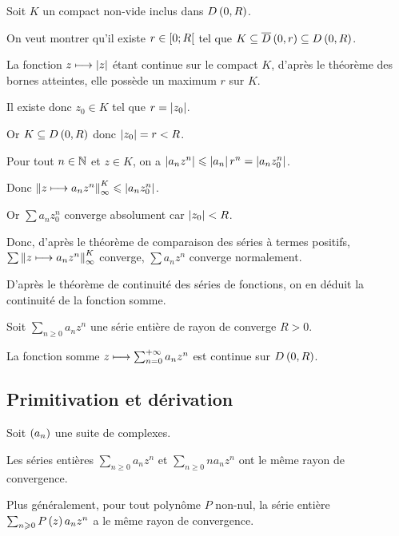 \begin{dem}
Soit \(K\) un compact non-vide inclus dans \(\disqueo{0}{R}\).

On veut montrer qu'il existe \(r\in\left[0;R\right[\) tel que \(K\subset\disquef{0}{r}\subset\disqueo{0}{R}\).

La fonction \(z\longmapsto\left\lvert z\right\rvert\) étant continue sur le compact \(K\), d'après le théorème des bornes atteintes, elle possède un maximum \(r\) sur \(K\).

Il existe donc \(z_0\in K\) tel que \(r=\left\lvert z_0\right\rvert\).

Or \(K\subset\disqueo{0}{R}\) donc \(\left\lvert z_0\right\rvert=r<R\).

Pour tout \(n\in\mathbb{N}\) et \(z\in K\), on a \(\left\lvert a_nz^n\right\rvert\leqslant\left\lvert a_n\right\rvert r^n=\left\lvert a_nz_0^n\right\rvert\).

Donc \(\norme{z\mapsto a_nz^n}_\infty^K\leq\abs{a_nz_0^n}\).

Or \(\sum a_nz_0^n\) converge absolument car \(\left\lvert z_0\right\rvert<R\).

Donc, d'après le théorème de comparaison des séries à termes positifs, \(\sum\norme{z\mapsto a_nz^n}_\infty^K\) converge, \ie \(\sum a_nz^n\) converge normalement.
\end{dem}

D'après le théorème de continuité des séries de fonctions, on en déduit la continuité de la fonction somme.

\begin{theo}
Soit \(\sum_{n\geq0}a_nz^n\) une série entière de rayon de converge \(R>0\).

La fonction somme \(z\longmapsto\sum_{n=0}^{+\infty}a_nz^n\) est continue sur \(\disqueo{0}{R}\).
\end{theo}

\subsection{Primitivation et dérivation}

\begin{lem}
Soit \(\left(a_n\right)\) une suite de complexes.

Les séries entières \(\sum_{n\geq0}a_nz^n\) et \(\sum_{n\geq0}na_nz^n\) ont le même rayon de convergence.

Plus généralement, pour tout polynôme \(P\) non-nul, la série entière \(\sum_{n\geqslant0}P\left(z\right)a_nz^n\) a le même rayon de convergence.
\end{lem}

